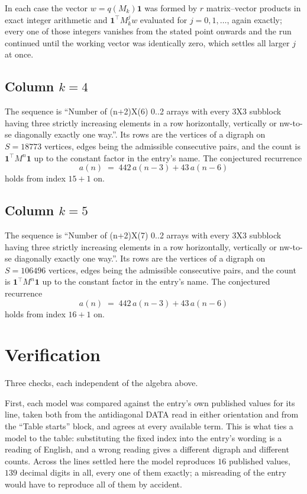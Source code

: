 \documentclass[11pt,a4paper]{article}
\theoremstyle{plain}
\theoremstyle{definition}
\begin{document}
In each case the vector $w=q(M_k)\mathbf{1}$ was formed by $r$ matrix--vector products in
exact integer arithmetic and $\mathbf{1}^{\!\top}M_k^{j}w$ evaluated for $j=0,1,\dots$,
again exactly; every one of those integers vanishes from the stated point onwards and the run
continued until the working vector was identically zero, which settles all larger $j$ at once.

\subsection*{Column $k$$=4$}
The sequence is ``Number of (n+2)X(6) 0..2 arrays with every 3X3 subblock having three strictly increasing elements in a row horizontally, vertically or nw-to-se diagonally exactly one way.''. Its rows are the vertices of a digraph on
$S=18773$ vertices, edges being the admissible consecutive pairs, and the count is
$\mathbf{1}^{\!\top}M^{n}\mathbf{1}$ up to the constant factor in the entry's name.
The conjectured recurrence
\[
a(n)\;=\;442\,a(n-3) + 43\,a(n-6)
\]
holds from index $15+1$ on.

\subsection*{Column $k$$=5$}
The sequence is ``Number of (n+2)X(7) 0..2 arrays with every 3X3 subblock having three strictly increasing elements in a row horizontally, vertically or nw-to-se diagonally exactly one way.''. Its rows are the vertices of a digraph on
$S=106496$ vertices, edges being the admissible consecutive pairs, and the count is
$\mathbf{1}^{\!\top}M^{n}\mathbf{1}$ up to the constant factor in the entry's name.
The conjectured recurrence
\[
a(n)\;=\;442\,a(n-3) + 43\,a(n-6)
\]
holds from index $16+1$ on.

\section{Verification}

Three checks, each independent of the algebra above.

First, each model was compared against the entry's own published values for its line, taken
both from the antidiagonal DATA read in either orientation and from the ``Table starts''
block, and agrees at every available term. This is what ties a model to the table:
substituting the fixed index into the entry's wording is a reading of English, and a wrong
reading gives a different digraph and different counts. Across the lines settled here the
model reproduces $16$ published values, $139$ decimal digits in all, every one of
them exactly; a misreading of the entry would have to reproduce all of them by accident.
\end{document}

